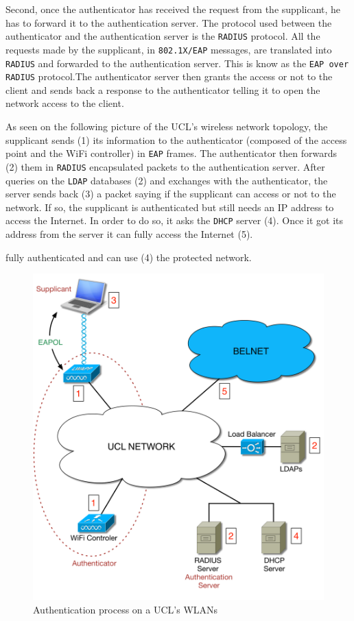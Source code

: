 Second, once the authenticator has received the request from the supplicant, he has to forward it to the authentication server. The protocol used between the authenticator and the authentication server is the \texttt{RADIUS} protocol. All the requests made by the supplicant, in \texttt{802.1X/EAP} messages, are translated into \texttt{RADIUS} and forwarded to the authentication server. This is know as the \texttt{EAP over RADIUS} protocol.The authenticator server then grants the access or not to the client and sends back a response to the authenticator telling it to open the network access to the client.

As seen on the following picture of the UCL's wireless network topology, the supplicant sends (1) its information to the authenticator (composed of the access point and the WiFi controller) in \texttt{EAP} frames. The authenticator then forwards (2) them in \texttt{RADIUS} encapsulated packets to the authentication server. After queries on the \texttt{LDAP} databases (2) and exchanges with the authenticator, the server sends back (3) a packet saying if the supplicant can access or not to the network. If so, the supplicant is authenticated but still needs an IP address to access the Internet. In order to do so, it asks the \texttt{DHCP} server (4). Once it got its address from the server it can fully access the Internet (5).

fully authenticated and can use (4) the protected network.

\begin{figure}[H]
	\includegraphics[width=.9\linewidth]{Pictures/Chapter2/topology2.png}
	\caption{Authentication process on a UCL's WLANs}
\end{figure}


